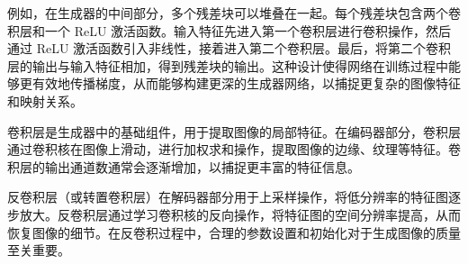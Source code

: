 例如，在生成器的中间部分，多个残差块可以堆叠在一起。每个残差块包含两个卷积层和一个 ReLU 激活函数。输入特征先进入第一个卷积层进行卷积操作，然后通过 ReLU 激活函数引入非线性，接着进入第二个卷积层。最后，将第二个卷积层的输出与输入特征相加，得到残差块的输出。这种设计使得网络在训练过程中能够更有效地传播梯度，从而能够构建更深的生成器网络，以捕捉更复杂的图像特征和映射关系。


\begin{figure}[htb]
    \centering
    \captionsetup{font=footnotesize}
    \label{fig:conv_detail}
\end{figure}

\begin{figure}[htb]
    \centering
    \captionsetup{font=footnotesize}
    \label{fig:convtranspose}
\end{figure}

卷积层是生成器中的基础组件，用于提取图像的局部特征。在编码器部分，卷积层通过卷积核在图像上滑动，进行加权求和操作，提取图像的边缘、纹理等特征。卷积层的输出通道数通常会逐渐增加，以捕捉更丰富的特征信息。

反卷积层（或转置卷积层）在解码器部分用于上采样操作，将低分辨率的特征图逐步放大。反卷积层通过学习卷积核的反向操作，将特征图的空间分辨率提高，从而恢复图像的细节。在反卷积过程中，合理的参数设置和初始化对于生成图像的质量至关重要。


